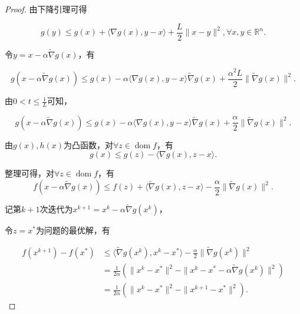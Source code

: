 \begin{proof}
    由下降引理可得

    \begin{equation*}
        g(y) \leq g(x) + \langle \nabla g(x), y-x \rangle + \frac{L}{2}\|x-y\|^{2}, \forall x, y \in \mathbb{R}^{n}.
    \end{equation*}

    令$y=x-\alpha\tilde{\nabla} g(x)$，有

    \begin{equation*}
        g(x-\alpha\tilde{\nabla} g(x)) \leq g(x) - \alpha \langle \nabla g(x), y-x \rangle \tilde{\nabla} g(x) + \frac{\alpha^{2}L}{2}\|\tilde{\nabla} g(x)\|^{2}.
    \end{equation*}

    由$0<t\leq \frac{1}{L}$可知，

    \begin{equation*}
        g(x-\alpha\tilde{\nabla} g(x)) \leq g(x) - \alpha \langle \nabla g(x), y-x \rangle \tilde{\nabla} g(x) + \frac{\alpha}{2}\|\tilde{\nabla} g(x)\|^{2}.
    \end{equation*}

    由$g(x), h(x)$为凸函数，对$\forall z \in \mathop{\mathrm{dom}} f$，有
    \begin{equation*}
        g(x) \leq g(z) - \langle \nabla g(x), z-x  \rangle.
    \end{equation*}

    整理可得，对$\forall z \in \mathop{\mathrm{dom}} f$，有
    \begin{equation*}
        f(x-\alpha\tilde{\nabla} g(x)) \leq f(z) + \langle \tilde{\nabla}g(x), z-x \rangle - \frac{\alpha}{2}\|\tilde{\nabla} g(x)\|^{2}.
    \end{equation*}

    记第$k+1$次迭代为$x^{k+1}=x^{k}-\alpha\tilde{\nabla}g(x^{k})$，
    
    令$z=x^{*}$为问题的最优解，有

    \begin{equation}
        \begin{split}
            f(x^{k+1})-f(x^{*}) &\leq \langle \tilde{\nabla}g(x^{k}), x^{k}-x^{*} \rangle - \frac{\alpha}{2}\|\tilde{\nabla}g(x^{k})\|^{2} \\
            &=\frac{1}{2\alpha}(\|x^{k}-x^{*}\|^{2} - \|x^{k}-x^{*}-\alpha\tilde{\nabla}g(x^{k})\|^{2}) \\
            &=\frac{1}{2\alpha}(\|x^{k}-x^{*}\|^{2} - \|x^{k+1}-x^{*}\|^{2}).
        \end{split}
    \end{equation}


\end{proof}
